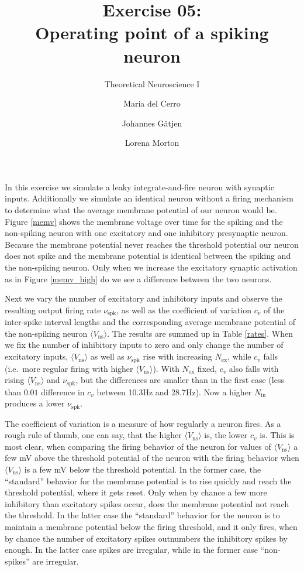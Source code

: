 \documentclass{scrartcl}
\title{Exercise 05:\\Operating point of a spiking neuron}
\subtitle{Theoretical Neuroscience I}
\author{Maria del Cerro \and Johannes G\"atjen \and Lorena Morton}
\begin{document}
\maketitle

In this exercise we simulate a leaky integrate-and-fire neuron with synaptic inputs. Additionally we simulate an identical neuron without a firing mechanism  to determine what the average membrane potential of our neuron would be. Figure \ref{memv} shows the membrane voltage over time for the spiking and the non-spiking neuron with one excitatory and one inhibitory presynaptic neuron. Because the membrane potential never reaches the threshold potential our neuron does not spike and the membrane potential is identical between the spiking and the non-spiking neuron. Only when we increase the excitatory synaptic activation as in Figure \ref{memv_high} do we see a difference between the two neurons.

Next we vary the number of excitatory and inhibitory inputs and observe the resulting output firing rate $\nu_\mathrm{spk}$, as well as the coefficient of variation $c_v$ of the inter-spike interval lengths and the corresponding average membrane potential of the non-spiking neuron $\langle V_\mathrm{ns}\rangle $. The results are summed up in Table \ref{rates}. When we fix the number of inhibitory inputs to zero and only change the number of excitatory inputs, $\langle V_\mathrm{ns}\rangle$ as well as $\nu_\mathrm{spk}$ rise with increasing $N_\mathrm{ex}$, while $c_v$ falls (i.e.\ more regular firing with higher $\langle V_\mathrm{ns}\rangle$). With $N_\mathrm{ex}$ fixed, $c_v$ also falls with rising $\langle V_\mathrm{ns}\rangle$ and $\nu_\mathrm{spk}$, but the differences are smaller than in the first case (less than $0.01$ difference in $c_v$ between 10.3\si{Hz} and 28.7\si{Hz}). Now a higher $N_\mathrm{in}$ produces a lower $\nu_\mathrm{spk}$.

The coefficient of variation is a measure of how regularly a neuron fires. As a rough rule of thumb, one can say, that the higher $\langle V_\mathrm{ns}\rangle$ is, the lower $c_v$ is. This is most clear, when comparing the firing behavior of the neuron for values of $\langle V_\mathrm{ns}\rangle$ a few \si{mV} above the threshold potential of the neuron with the firing behavior when $\langle V_\mathrm{ns}\rangle$ is a few \si{mV} below the threshold potential. In the former case, the ``standard'' behavior for the membrane potential is to rise quickly and reach the threshold potential, where it gets reset. Only when by chance a few more inhibitory than excitatory spikes occur, does the membrane potential not reach the threshold. In the latter case the ``standard'' behavior for the neuron is to maintain a membrane potential below the firing threshold, and it only fires, when by chance the number of excitatory spikes outnumbers the inhibitory spikes by enough. In the latter case spikes are irregular, while in the former case ``non-spikes'' are irregular.
\end{document}
